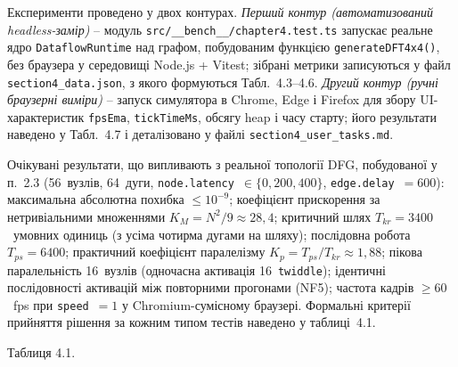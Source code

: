 \documentclass[
]{article}
\begin{document}
Експерименти проведено у двох контурах. \emph{Перший контур
(автоматизований headless-замір)} -- модуль
\texttt{src}\texttt{/\_\_bench\_\_/}\texttt{chapter4.test.ts} запускає
реальне ядро \texttt{DataflowRuntime} над графом, побудованим функцією
\texttt{generateDFT4x4()}, без браузера у середовищі Node.js + Vitest;
зібрані метрики записуються у файл \texttt{section4\_data.json}, з якого
формуються Табл.~4.3--4.6. \emph{Другий контур (ручні браузерні виміри)}
-- запуск симулятора в Chrome, Edge і Firefox для збору
UI-характеристик \texttt{fpsEma}, \texttt{tickTimeMs}, обсягу heap і
часу старту; його результати наведено у Табл.~4.7 і деталізовано у
файлі \texttt{section4\_user\_tasks.md}.

Очікувані результати, що випливають з реальної топології DFG, побудованої
у п.~2.3 (56~вузлів, 64~дуги, \texttt{node.latency}~\(\in \{0,200,400\}\),
\texttt{edge.delay}~\(= 600\)): максимальна абсолютна похибка
\(\leq 10^{- 9}\); коефіцієнт прискорення за нетривіальними множеннями
\(K_{M} = N^{2}/9 \approx 28,4\); критичний шлях
\(T_{kr} = 3400\)~умовних одиниць (з усіма чотирма дугами на шляху);
послідовна робота \(T_{ps} = 6400\); практичний коефіцієнт паралелізму
\(K_{p} = T_{ps}/T_{kr} \approx 1,88\); пікова паралельність 16~вузлів
(одночасна активація 16~\texttt{twiddle}); ідентичні послідовності
активацій між повторними прогонами (NF5); частота кадрів
\(\geq 60\)~fps при \texttt{speed}~\(= 1\) у Chromium-сумісному
браузері. Формальні критерії прийняття рішення за кожним типом тестів
наведено у таблиці~4.1.

Таблиця 4.1.
\end{document}
